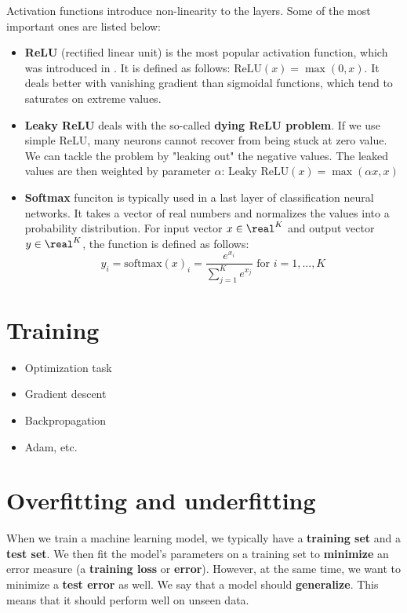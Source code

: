 Activation functions introduce non-linearity to the layers. Some of the most important ones are listed below:
\begin{itemize}
\item \textbf{ReLU} (rectified linear unit) is the most popular activation function, which was introduced in \cite{pmlr-v15-glorot11a}. It is defined as follows: $\text{ReLU}(x) = \max(0, x)$. It deals better with vanishing gradient than sigmoidal functions, which tend to saturates on extreme values.
\item \textbf{Leaky ReLU} deals with the so-called \textbf{dying ReLU problem}. If we use simple ReLU, many neurons cannot recover from being stuck at zero value. We can tackle the problem by "leaking out" the negative values. The leaked values are then weighted by parameter $\alpha$: $\text{Leaky ReLU}(x) = \max(\alpha x, x)$
\item \textbf{Softmax} funciton is typically used in a last layer of classification neural networks. It takes a vector of real numbers and normalizes the values into a probability distribution. For input vector $x \in \real^K$ and output vector $y \in \real^K$, the function is defined as follows:
$$
    y_i = \text{softmax}(x)_i = \frac{e^{x_i}}{\sum\limits^{K}_{j = 1} e^{x_j}} \text{ for } i = 1,...,K
$$
\end{itemize}

\section{Training} 
\begin{itemize}
    \item Optimization task
    \item Gradient descent
    \item Backpropagation
    \item Adam, etc.
\end{itemize}

\section{Overfitting and underfitting}

When we train a machine learning model, we typically have a \textbf{training set} and a \textbf{test set}. We then fit the model's parameters on a training set to \textbf{minimize} an error measure (a \textbf{training loss} or \textbf{error}). However, at the same time, we want to minimize a \textbf{test error} as well. We say that a model should \textbf{generalize}. This means that it should perform well on unseen data.

